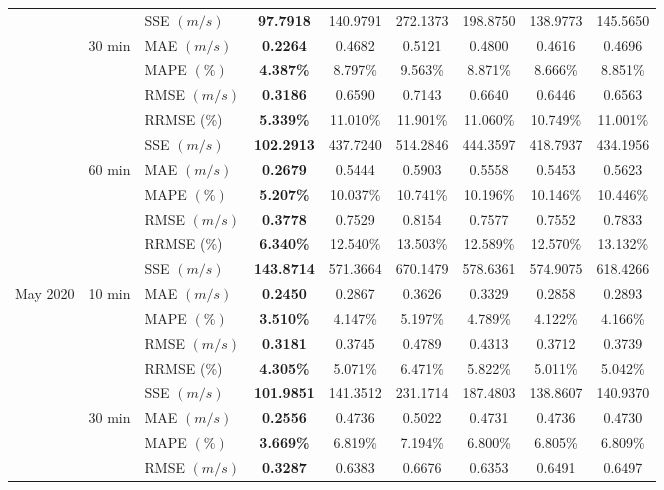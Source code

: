 {\begin{longtable}[htb!]{lllcccccc}
& {} & {SSE {$(m/s)$}} & {\textbf{97.7918}} & {140.9791} & {272.1373} & {198.8750} & {138.9773} & {145.5650} \\
& 30 min & MAE {$(m/s)$} & \textbf{0.2264} & 0.4682 & 0.5121 & 0.4800 & 0.4616 & 0.4696 \\
&  & MAPE {$(\%)$} & \textbf{4.387\%} & 8.797\% & 9.563\% & 8.871\% & 8.666\% & 8.851\% \\
&  & RMSE {$(m/s)$} & \textbf{0.3186} & 0.6590 & 0.7143 & 0.6640 & 0.6446 & 0.6563 \\
& {} & {RRMSE {(\%)}} & {\textbf{5.339\%}} & {11.010\%} & {11.901\%} & {11.060\%} & {10.749\%} & {11.001\%} \\
& {} & {SSE {$(m/s)$}} & {\textbf{102.2913}} & {437.7240} & {514.2846} & {444.3597} & {418.7937} & {434.1956} \\
& 60 min & MAE {$(m/s)$} & \textbf{0.2679} & 0.5444 & 0.5903 & 0.5558 & 0.5453 & 0.5623 \\
&  & MAPE {$(\%)$} & \textbf{5.207\%} & 10.037\% & 10.741\% & 10.196\% & 10.146\% & 10.446\% \\
&  & RMSE {$(m/s)$} & \textbf{0.3778} & 0.7529 & 0.8154 & 0.7577 & 0.7552 & 0.7833 \\
& {} & {RRMSE {(\%)}} & {\textbf{6.340\%}} & {12.540\%} & {13.503\%} & {12.589\%} & {12.570\%} & {13.132\%} \\
& {} & {SSE {$(m/s)$}} & {\textbf{143.8714}} & {571.3664} & {670.1479} & {578.6361} & {574.9075} & {618.4266} \\ \hline
May 2020 & 10 min & MAE {$(m/s)$} & \textbf{0.2450} & 0.2867 & 0.3626 & 0.3329 & 0.2858 & 0.2893 \\
&  & MAPE {$(\%)$} & \textbf{3.510\%} & 4.147\% & 5.197\% & 4.789\% & 4.122\% & 4.166\% \\
&  & RMSE {$(m/s)$} & \textbf{0.3181} & 0.3745 & 0.4789 & 0.4313 & 0.3712 & 0.3739 \\
& {} & {RRMSE {(\%)}} & {\textbf{4.305\%}} & {5.071\%} & {6.471\%} & {5.822\%} & {5.011\%} & {5.042\%} \\
& {} & {SSE {$(m/s)$}} & {\textbf{101.9851}} & {141.3512} & {231.1714} & {187.4803} & {138.8607} & {140.9370} \\
& 30 min & MAE {$(m/s)$} & \textbf{0.2556} & 0.4736 & 0.5022 & 0.4731 & 0.4736 & 0.4730 \\
&  & MAPE {$(\%)$} & \textbf{3.669\%} & 6.819\% & 7.194\% & 6.800\% & 6.805\% & 6.809\% \\
&  & RMSE {$(m/s)$} & \textbf{0.3287} & 0.6383 & 0.6676 & 0.6353 & 0.6491 & 0.6497 \\

\end{longtable}}
